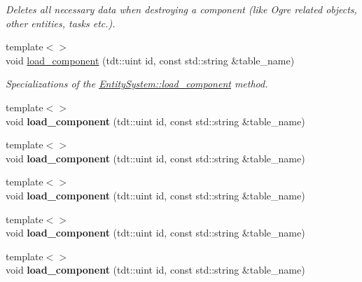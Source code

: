 \begin{DoxyCompactItemize}
\begin{DoxyCompactList}\small\item\em Deletes all necessary data when destroying a component (like Ogre related objects, other entities, tasks etc.). \end{DoxyCompactList}\item 
{\footnotesize template$<$$>$ }\\void \hyperlink{class_entity_system_ac8eead7736efd2ae728661f901142b27}{load\+\_\+component} (tdt\+::uint id, const std\+::string \&table\+\_\+name)
\begin{DoxyCompactList}\small\item\em Specializations of the \hyperlink{class_entity_system_ac2d122f65e967b51cc37227b5dd0a7fe}{Entity\+System\+::load\+\_\+component} method. \end{DoxyCompactList}\item 
{\footnotesize template$<$$>$ }\\void {\bfseries load\+\_\+component} (tdt\+::uint id, const std\+::string \&table\+\_\+name)\hypertarget{class_entity_system_ac8eead7736efd2ae728661f901142b27}{}\label{class_entity_system_ac8eead7736efd2ae728661f901142b27}

\item 
{\footnotesize template$<$$>$ }\\void {\bfseries load\+\_\+component} (tdt\+::uint id, const std\+::string \&table\+\_\+name)\hypertarget{class_entity_system_ac8eead7736efd2ae728661f901142b27}{}\label{class_entity_system_ac8eead7736efd2ae728661f901142b27}

\item 
{\footnotesize template$<$$>$ }\\void {\bfseries load\+\_\+component} (tdt\+::uint id, const std\+::string \&table\+\_\+name)\hypertarget{class_entity_system_ac8eead7736efd2ae728661f901142b27}{}\label{class_entity_system_ac8eead7736efd2ae728661f901142b27}

\item 
{\footnotesize template$<$$>$ }\\void {\bfseries load\+\_\+component} (tdt\+::uint id, const std\+::string \&table\+\_\+name)\hypertarget{class_entity_system_ac8eead7736efd2ae728661f901142b27}{}\label{class_entity_system_ac8eead7736efd2ae728661f901142b27}

\item 
{\footnotesize template$<$$>$ }\\void {\bfseries load\+\_\+component} (tdt\+::uint id, const std\+::string \&table\+\_\+name)\hypertarget{class_entity_system_ac8eead7736efd2ae728661f901142b27}{}\label{class_entity_system_ac8eead7736efd2ae728661f901142b27}


\end{DoxyCompactItemize}
